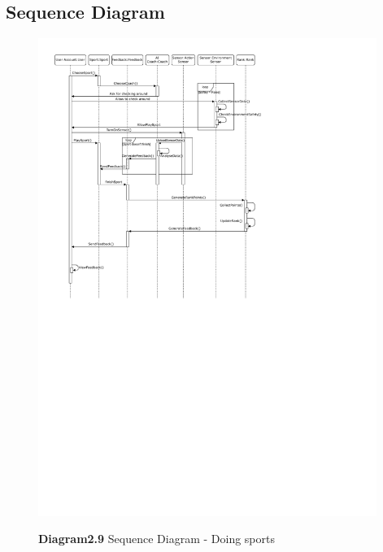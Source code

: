 \documentclass[a4paper]{article}
\begin{document}
	\subsection{Sequence Diagram}

	\begin{figure}[H]
		\centering
		\caption*{\textbf{Diagram2.9} Sequence Diagram - Doing sports}
		\includegraphics[width = 0.98\textwidth]{images/SequenceDiagram_Sport.pdf}
		\label{SD_Sport}
	\end{figure}
\end{document}
